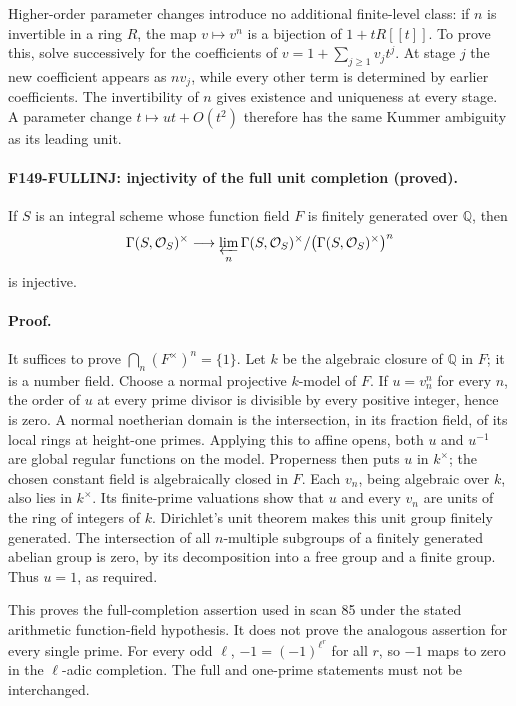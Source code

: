 \documentclass[11pt,a4paper]{article}
\theoremstyle{definition}
\begin{document}
Higher-order parameter changes introduce no additional finite-level
class: if \(n\) is invertible in a ring \(R\), the map
\(v\mapsto v^n\) is a bijection of \(1+tR[[t]]\).
To prove this, solve successively for the coefficients of
\(v=1+\sum_{j\geq1}v_jt^j\).  At stage \(j\) the new coefficient appears
as \(nv_j\), while every other term is determined by earlier
coefficients.  The invertibility of \(n\) gives existence and uniqueness
at every stage.  A parameter change \(t\mapsto ut+O(t^2)\) therefore has
the same Kummer ambiguity as its leading unit.

\paragraph{F149-FULLINJ: injectivity of the full unit completion (proved).}
If \(S\) is an integral scheme whose function field \(F\) is finitely
generated over \(\mathbb Q\), then
\[
 \Gamma(S,\mathcal O_S)^\times
 \longrightarrow
 \varprojlim_n\Gamma(S,\mathcal O_S)^\times/
       \bigl(\Gamma(S,\mathcal O_S)^\times\bigr)^n
\]
is injective.

\paragraph{Proof.}
It suffices to prove \(\bigcap_n(F^\times)^n=\{1\}\).  Let \(k\) be the
algebraic closure of \(\mathbb Q\) in \(F\); it is a number field.
Choose a normal projective \(k\)-model of \(F\).  If \(u=v_n^n\) for
every \(n\), the order of \(u\) at every prime divisor is divisible by
every positive integer, hence is zero.  A normal noetherian domain is
the intersection, in its fraction field, of its local rings at
height-one primes.  Applying this to affine opens, both \(u\) and
\(u^{-1}\) are global regular functions on the model.  Properness then
puts \(u\) in \(k^\times\); the chosen constant field is algebraically
closed in \(F\).  Each \(v_n\), being algebraic over \(k\), also lies in
\(k^\times\).  Its finite-prime valuations show that \(u\) and every
\(v_n\) are units of the ring of integers of \(k\).  Dirichlet's unit
theorem makes this unit group finitely generated.  The intersection
of all \(n\)-multiple subgroups of a finitely generated abelian group
is zero, by its decomposition into a free group and a finite group.
Thus \(u=1\), as required.

This proves the full-completion assertion used in scan 85 under the
stated arithmetic function-field hypothesis.  It does not prove the
analogous assertion for every single prime.  For every odd \(\ell\),
\(-1=(-1)^{\ell^r}\) for all \(r\), so \(-1\) maps to zero in the
\(\ell\)-adic completion.  The full and one-prime statements must not
be interchanged.
\end{document}

